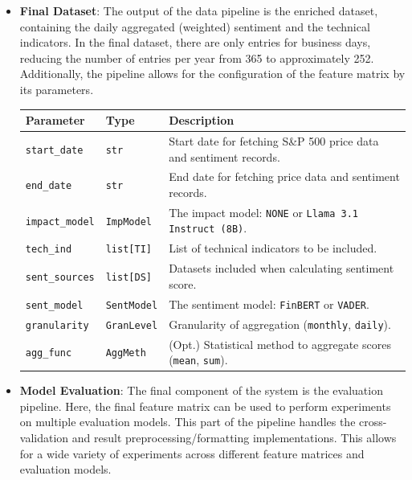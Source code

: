 \documentclass[Master,english,IEEE]{twbook}
\begin{document}
\begin{itemize}
    \item \textbf{Final Dataset}: The output of the data pipeline is the enriched dataset, containing the daily aggregated (weighted) sentiment and the technical indicators. In the final dataset, there are only entries for business days, reducing the number of entries per year from 365 to approximately 252. Additionally, the pipeline allows for the configuration of the feature matrix by its parameters.
    \par\vspace{2ex} %
    \begin{minipage}{\linewidth}
        \centering
        \small
        \begin{tabularx}{0.98\linewidth}{|l|l|X|}
        \hline
        \textbf{Parameter} & \textbf{Type} & \textbf{Description} \\ \hline
        \texttt{start\_date} & \texttt{str} & Start date for fetching S\&P 500 price data and sentiment records. \\ \hline
        \texttt{end\_date} & \texttt{str} & End date for fetching price data and sentiment records. \\ \hline
        \texttt{impact\_model} & \texttt{ImpModel} & The impact model: \texttt{NONE} or \texttt{Llama 3.1 Instruct (8B)}. \\ \hline
        \texttt{tech\_ind} & \texttt{list[TI]} & List of technical indicators to be included. \\ \hline
        \texttt{sent\_sources} & \texttt{list[DS]} & Datasets included when calculating sentiment score. \\ \hline
        \texttt{sent\_model} & \texttt{SentModel} & The sentiment model: \texttt{FinBERT} or \texttt{VADER}. \\ \hline
        \texttt{granularity} & \texttt{GranLevel} & Granularity of aggregation (\texttt{monthly}, \texttt{daily}). \\ \hline
        \texttt{agg\_func} & \texttt{AggMeth} & (Opt.) Statistical method to aggregate scores (\texttt{mean}, \texttt{sum}). \\ \hline
        \end{tabularx}
        \label{tab:feature_matrix_params}
    \end{minipage}
    \par\vspace{1ex}

    \item \textbf{Model Evaluation}: The final component of the system is the evaluation pipeline. Here, the final feature matrix can be used to perform experiments on multiple evaluation models. This part of the pipeline handles the cross-validation and result preprocessing/formatting implementations. This allows for a wide variety of experiments across different feature matrices and evaluation models.
\end{itemize}
\end{document}
